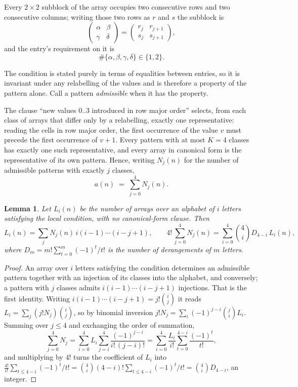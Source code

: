 \documentclass[11pt,a4paper]{article}
\theoremstyle{plain}
\newtheorem{lemma}[theorem]{Lemma}
\theoremstyle{definition}
\begin{document}
Every $2\times2$ subblock of the array occupies two consecutive
rows and two consecutive columns; writing those two rows as $r$ and $s$ the
subblock is
\[
\begin{pmatrix}\alpha&\beta\\\gamma&\delta\end{pmatrix}=\begin{pmatrix}r_j&r_{j+1}\\s_j&s_{j+1}\end{pmatrix},
\]
and the entry's requirement on it is
\begin{equation}\label{eq:loc}
\#\{\alpha,\beta,\gamma,\delta\}\in\{1,2\}.
\end{equation}

The condition is stated purely in terms of equalities between entries, so it is invariant
under any relabelling of the values and is therefore a property of the pattern alone. Call a
pattern \emph{admissible} when it has the property.

The clause ``new values $0..3$ introduced in row major order'' selects, from each class
of arrays that differ only by a relabelling, exactly one representative: reading the cells in
row major order, the first occurrence of the value $v$ must precede the first occurrence of
$v+1$. Every pattern with at most $K=4$ classes has exactly one such representative, and
every array in canonical form is the representative of its own pattern. Hence, writing
$N_j(n)$ for the number of admissible patterns with exactly $j$ classes,
\begin{equation}\label{eq:apat}
a(n)\;=\;\sum_{j=0}^{4}N_j(n).
\end{equation}

\begin{lemma}\label{lem:inv}
Let $L_i(n)$ be the number of arrays over an alphabet of $i$ letters satisfying the local
condition, with no canonical-form clause. Then
\[
L_i(n)=\sum_j N_j(n)\,i(i-1)\cdots(i-j+1),
\qquad
4!\,\sum_{j=0}^{4}N_j(n)=\sum_{i=0}^{4}\binom{4}{i}D_{4-i}\,L_i(n),
\]
where $D_m=m!\sum_{t=0}^{m}(-1)^t/t!$ is the number of derangements of $m$ letters.
\end{lemma}

\begin{proof}
An array over $i$ letters satisfying the condition determines an admissible pattern together
with an injection of its classes into the alphabet, and conversely; a pattern with $j$
classes admits $i(i-1)\cdots(i-j+1)$ injections. That is the first identity. Writing
$i(i-1)\cdots(i-j+1)=j!\binom{i}{j}$ it reads $L_i=\sum_j (j!N_j)\binom{i}{j}$, so by
binomial inversion $j!N_j=\sum_{i}(-1)^{j-i}\binom{j}{i}L_i$. Summing over
$j\le 4$ and exchanging the order of summation,
\[
\sum_{j=0}^{4}N_j=\sum_{i=0}^{4}L_i\sum_{j=i}^{4}\frac{(-1)^{j-i}}{i!\,(j-i)!}
=\sum_{i=0}^{4}\frac{L_i}{i!}\sum_{t=0}^{4-i}\frac{(-1)^t}{t!} ,
\]
and multiplying by $4!$ turns the coefficient of $L_i$ into
$\frac{4!}{i!}\sum_{t\le 4-i}(-1)^t/t!=\binom{4}{i}(4-i)!\sum_{t\le 4-i}(-1)^t/t!
=\binom{4}{i}D_{4-i}$, an integer.
\end{proof}
\end{document}
